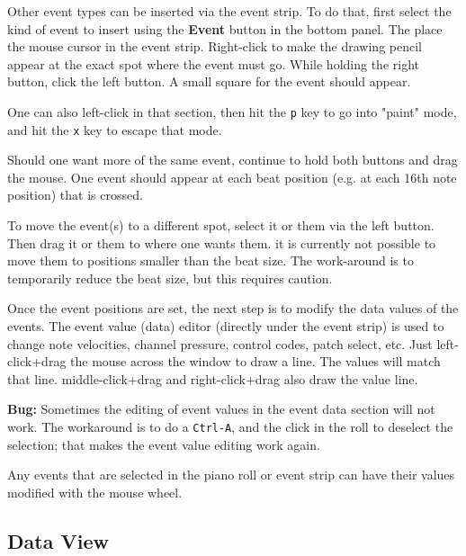    Other event types can be inserted via the event strip.
   To do that, first
   select the kind of event to insert using the \textbf{Event} button in the
   bottom panel.  The place the mouse cursor in the event strip.
   Right-click to make the drawing pencil appear at the exact spot where the
   event must go.  While holding the right button, click the left button.
   A small square for the event should appear.

   One can also left-click in that section,
   then hit the \texttt{p} key to go into "paint" mode,
   and hit the \texttt{x} key to escape that mode.

   Should one want more of the same event, continue to hold both buttons and
   drag the mouse.  One event should appear at each beat position (e.g. at
   each 16th note position) that is crossed.

   To move the event(s) to a different spot, select it or them via the left
   button.  Then drag it or them to where one wants them.
   it is currently not possible to move them to positions smaller than the
   beat size.  The work-around is to temporarily reduce the beat size,
   but this requires caution.

   Once the event positions are set, the next step is to modify the
   data values of the events.
	The event value (data) editor (directly under the event strip) is used 
	to change note velocities, channel pressure, control codes,
	patch select, etc.
   Just left-click+drag the mouse across the window to draw a line.  The
   values will match that line.  
   middle-click+drag and right-click+drag also
   draw the value line.

   \textbf{Bug:}
   Sometimes the editing of event values in the event data section will not work.
   The workaround is to do a \texttt{Ctrl-A}, and the click in the roll
   to deselect the selection; that makes the event value editing work again.
   
   Any events that are selected in the piano roll or event strip can have
   their values modified with the mouse wheel.

\subsection{Data View}
\label{subsec:pattern_editor_data_view}

